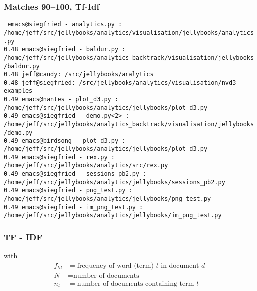 \begin{frame}
  \frametitle{Matches 90--100, Tf-Idf}
  \tt\tiny
emacs@siegfried - analytics.py : /home/jeff/src/jellybooks/analytics/visualisation/jellybooks/analytics.py\\[2mm]
\hspace{2mm}0.48 emacs@siegfried - baldur.py : /home/jeff/src/jellybooks/analytics\_backtrack/visualisation/jellybooks/baldur.py\\
\hspace{2mm}0.48 jeff@candy:~/src/jellybooks/analytics\\
\hspace{2mm}0.48 jeff@siegfried:~/src/jellybooks/analytics/visualisation/nvd3-examples\\
\hspace{2mm}0.49 emacs@nantes - plot\_d3.py : /home/jeff/src/jellybooks/analytics/jellybooks/plot\_d3.py\\
\hspace{2mm}0.49 emacs@siegfried - demo.py<2> : /home/jeff/src/jellybooks/analytics\_backtrack/visualisation/jellybooks/demo.py\\
\hspace{2mm}0.49 emacs@birdsong - plot\_d3.py : /home/jeff/src/jellybooks/analytics/jellybooks/plot\_d3.py\\
\hspace{2mm}0.49 emacs@siegfried - rex.py : /home/jeff/src/jellybooks/analytics/src/rex.py\\
\hspace{2mm}0.49 emacs@siegfried - sessions\_pb2.py : /home/jeff/src/jellybooks/analytics/jellybooks/sessions\_pb2.py\\
\hspace{2mm}0.49 emacs@siegfried - png\_test.py : /home/jeff/src/jellybooks/analytics/jellybooks/png\_test.py\\
\hspace{2mm}0.49 emacs@siegfried - im\_png\_test.py : /home/jeff/src/jellybooks/analytics/jellybooks/im\_png\_test.py 
\end{frame}

\begin{frame}
  \frametitle{TF - IDF}

  with
  \begin{align*}
    f_{td} &= \mbox{frequency of word (term) $t$ in document $d$} \\
    N &= \mbox{number of documents}\\
    n_t &= \mbox{number of documents containing term $t$}
  \end{align*}
\end{frame}

